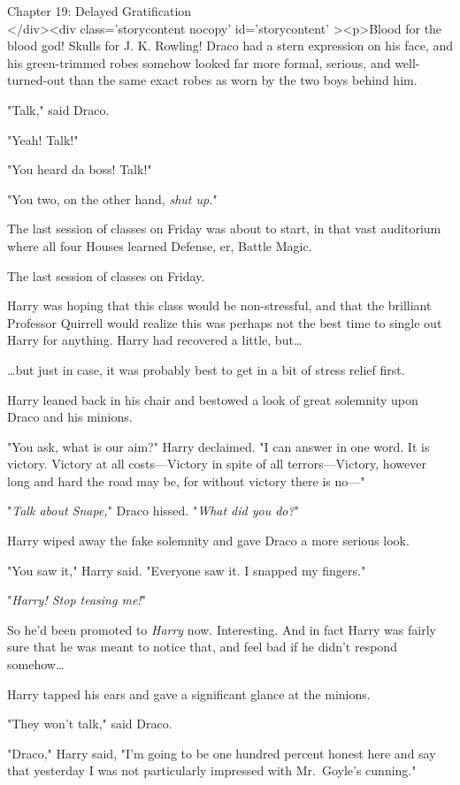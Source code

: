 
Chapter 19: Delayed Gratification\\
</div><div  class='storycontent nocopy' id='storycontent' ><p>Blood for the 
blood god! Skulls for J. K. Rowling!
\sbreak
Draco had a stern expression on his face, and his green-trimmed robes somehow 
looked far more formal, serious, and well-turned-out than the same exact robes 
as worn by the two boys behind him.

"Talk," said Draco.

"Yeah! Talk!"

"You heard da boss! Talk!"

"You two, on the other hand, \emph{shut up.}"

The last session of classes on Friday was about to start, in that vast 
auditorium where all four Houses learned Defense, er, Battle Magic.

The last session of classes on Friday.

Harry was hoping that this class would be non-stressful, and that the brilliant 
Professor Quirrell would realize this was perhaps not the best time to single 
out Harry for anything. Harry had recovered a little, but{\ldots}

{\ldots}but just in case, it was probably best to get in a bit of stress relief 
first.

Harry leaned back in his chair and bestowed a look of great solemnity upon 
Draco and his minions.

"You ask, what is our aim?" Harry declaimed. "I can answer in one word. It is 
victory. Victory at all costs---Victory in spite of all terrors---Victory, 
however long and hard the road may be, for without victory there is no---"

"\emph{Talk about Snape,}" Draco hissed. "\emph{What did you do?}"

Harry wiped away the fake solemnity and gave Draco a more serious look.

"You saw it," Harry said. "Everyone saw it. I snapped my fingers."

"\emph{Harry! Stop teasing me!}"

So he'd been promoted to \emph{Harry} now. Interesting. And in fact Harry was 
fairly sure that he was meant to notice that, and feel bad if he didn't respond 
somehow{\ldots}

Harry tapped his ears and gave a significant glance at the minions.

"They won't talk," said Draco.

"Draco," Harry said, "I'm going to be one hundred percent honest here and say 
that yesterday I was not particularly impressed with Mr.~Goyle's cunning."

